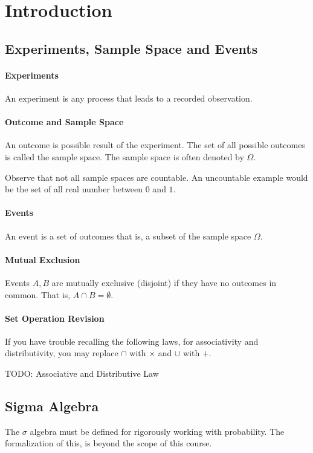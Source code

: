 
\section{Introduction}  

\subsection{Experiments, Sample Space and Events}

\paragraph{Experiments}
An experiment is  any process that leads to a recorded observation.

\paragraph {Outcome and Sample Space}
An outcome is possible result of the experiment. The set of all possible
outcomes is called the sample space. The sample space is often denoted by \(\Omega\).

Observe that not all sample spaces are countable. An uncountable example would be the set of all real number between \(0\) and \(1\).

\paragraph {Events}
An event is a set of outcomes that is, a subset of the sample space \(\Omega\).

\paragraph {Mutual Exclusion}
Events \(A, B\) are mutually exclusive (disjoint) if they have no outcomes in common.
That is, \(A\cap B = \emptyset\).

\paragraph {Set Operation Revision}
If you have trouble recalling the following laws, for associativity and
distributivity, you may replace \(\cap\) with \(\times\) and \(\cup\) with
\(+\). 

TODO: Associative and Distributive Law

\subsection{Sigma Algebra}
The \(\sigma\) algebra must be defined for rigorously working with probability.
The formalization of this, is beyond the scope of this course.

